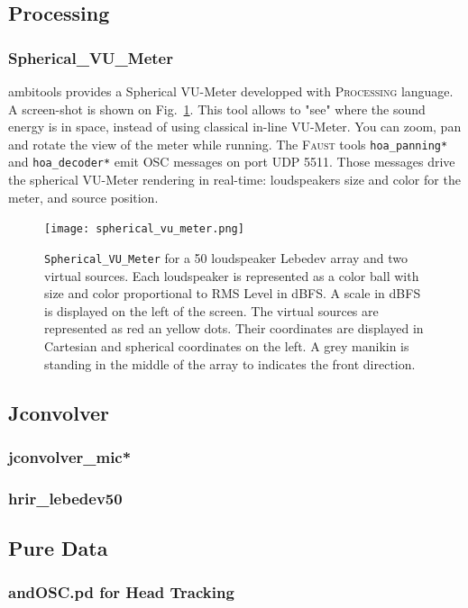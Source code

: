 \documentclass[10pt,a4paper]{article}
\begin{document}
\subsection{Processing}
\subsubsection{Spherical\_VU\_Meter}
\label{sec:processing}
ambitools provides a Spherical VU-Meter developped with \textsc{Processing} language. A screen-shot is shown on Fig.~\ref{fig:spherical_vu_meter}. This tool allows to "see" where the sound energy is in space, instead of using classical in-line VU-Meter. You can zoom, pan and rotate the view of the meter while running. The \textsc{Faust} tools \lstinline'hoa_panning*' and \lstinline'hoa_decoder*' emit \textsc{OSC} messages on port UDP 5511. Those messages drive the spherical VU-Meter rendering in real-time: loudspeakers size and color for the meter, and source position.
\begin{figure}[!ht]
\centering
\texttt{[image: spherical\_vu\_meter.png]}
\caption{\lstinline'Spherical_VU_Meter' for a 50 loudspeaker Lebedev array and two virtual sources. Each loudspeaker is represented as a color ball with size and color proportional to RMS Level in dBFS. A scale in dBFS is displayed on the left of the screen. The virtual sources are represented as red an yellow dots. Their coordinates are displayed in Cartesian and spherical coordinates on the left. A grey manikin is standing in the middle of the array to indicates the front direction.}
\label{fig:spherical_vu_meter}
\end{figure}

\pagebreak
\subsection{Jconvolver}
\label{sec:jconvolver}
\subsubsection{jconvolver\_mic*}
\subsubsection{hrir\_lebedev50}

\subsection{Pure Data}
\subsubsection{andOSC.pd for Head Tracking}
\label{sec:andOSC}
\end{document}
